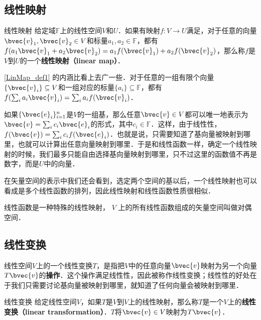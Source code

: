 
\begin{issues}
\issueTODO
{}
\end{issues}



\subsection{线性映射}
\begin{definition}{线性映射}\label{LinMap_def1}
给定域$\mathbb{F}$上的线性空间$V$和$U$．如果有映射$f:V\rightarrow U$满足，对于任意的向量$\bvec{v}_1, \bvec{v}_2\in V$和标量$a_1, a_2\in\mathbb{F}$，都有$f(a_1\bvec{v}_1+a_2\bvec{v}_2)=a_1f(\bvec{v}_1)+a_2f(\bvec{v}_2)$，那么称$f$是$V$到$U$的一个\textbf{线性映射（linear map）}．
\end{definition}


\autoref{LinMap_def1} 的内涵比看上去广一些．对于任意的一组有限个向量$\{\bvec{v}_i\}\subseteq V$和一组对应的标量$\{a_i\}\subseteq\mathbb{F}$，都有$f(\sum_i a_i\bvec{v}_i)=\sum_i a_if(\bvec{v}_i)$．

如果$\{\bvec{e}_i\}_{i=1}^n$是$V$的一组基，那么任意$\bvec{v}\in V$都可以唯一地表示为$\bvec{v}=\sum_i c_i\bvec{e}_i$的形式，其中$c_i\in\mathbb{F}$．这样，由于线性性，$f(\bvec{v})=\sum_ic_if(\bvec{e}_i)$．也就是说，只需要知道了基向量被映射到哪里，也就可以计算出任意向量映射到哪里．于是和线性函数一样，确定一个线性映射的时候，我们最多只能自由选择基向量映射到哪里，只不过这里的函数值不再是数字，而是$U$中的向量．

在矢量空间的表示中我们还会看到，选定两个空间的基以后，一个线性映射也可以看成是多个线性函数的排列，因此线性映射和线性函数性质很相似．

线性函数是一种特殊的线性映射， $V$ 上的所有线性函数组成的矢量空间叫做对偶空间．

\subsection{线性变换}
线性空间$V$上的一个线性变换$T$，是指把$V$中的任意向量$\bvec{v}$映射为另一个向量$T\bvec{v}$的\textbf{操作}．这个操作满足线性性，因此被称作线性变换；线性性的好处在于我们只需要讨论基向量被映射到哪里，就知道了任何向量会被映射到哪里．


\begin{definition}{线性变换}
给定线性空间$V$，如果$T$是$V$到$V$上的线性映射，那么称$T$是一个$V$上的\textbf{线性变换（linear transformation）}．$T$将$\bvec{v}\in V$映射为$T\bvec{v}$．
\end{definition}
